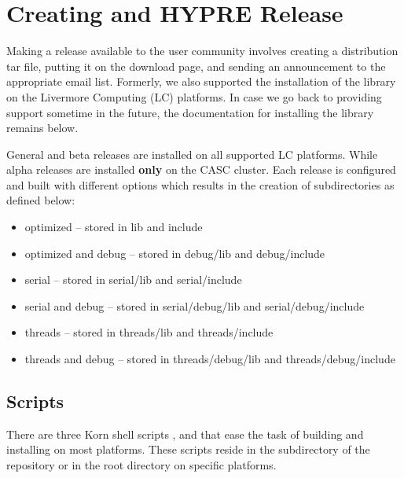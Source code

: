 \chapter{Creating and HYPRE Release}
\label{Creating and HYPRE Release}

Making a \hypre{} release available to the user community involves creating a
distribution tar file, putting it on the \hypre{} download page, and sending an
announcement to the appropriate email list.  Formerly, we also supported the
installation of the library on the Livermore Computing (LC) platforms.  In case
we go back to providing support sometime in the future, the documentation for
installing the library remains below.

General and beta releases are installed on all supported LC platforms. While
alpha releases are installed {\bf only} on the CASC cluster.  Each release is
configured and built with different options which results in the creation of
subdirectories as defined below:
\begin{itemize}
\item optimized -- stored in lib and include
\item optimized and debug -- stored in debug/lib and debug/include

\item serial -- stored in serial/lib and serial/include
\item serial and debug -- stored in serial/debug/lib and serial/debug/include

\item threads -- stored in threads/lib and threads/include
\item threads and debug -- stored in threads/debug/lib and threads/debug/include
\end{itemize}

\section{Scripts}
\label{Scripts}

There are three Korn shell scripts ,  and
 that ease the task of building and installing \hypre{} on most
platforms.  These scripts reside in the  subdirectory of the
\hypre{} repository or in the root directory on specific platforms.

